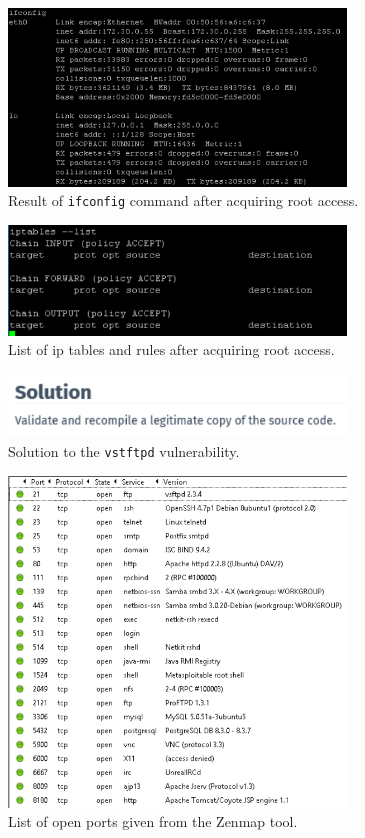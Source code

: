 \documentclass[a4paper]{article}
\begin{document}
	\begin{figure}[h!]
		\centering
		\includegraphics[width=0.8\textwidth]{1_3_12}
		\caption{Result of \texttt{ifconfig} command after acquiring root access.}
		\label{fig:4}
	\end{figure}

	\begin{figure}[h!]
		\centering
		\includegraphics[width=0.8\textwidth]{1_3_14}
		\caption{List of ip tables and rules after acquiring root access.}
		\label{fig:5}
	\end{figure}

	\begin{figure}[h!]
		\centering
		\includegraphics[width=0.8\textwidth]{1_3_20}
		\caption{Solution to the \texttt{vstftpd} vulnerability.}
		\label{fig:6}
	\end{figure}

	\begin{figure}[h!]
		\centering
		\includegraphics[width=0.8\textwidth]{2_1_6}
		\caption{List of open ports given from the Zenmap tool.}
		\label{fig:7}
	\end{figure}
\end{document}
